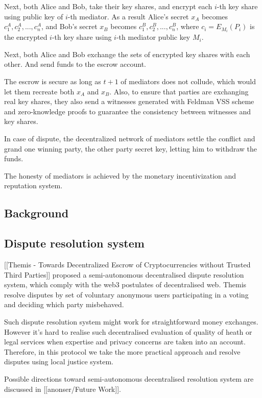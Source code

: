 \documentclass{article}
\begin{document}
Next, both Alice and Bob, take their key shares, and encrypt each $i$-th key share using public key of $i$-th mediator. As a result Alice's secret $x_A$ becomes ${c^A_1, c^A_2,...,c^A_n}$, and Bob's secret $x_B$ becomes ${c^B_1, c^B_2,...,c^B_n}$, where $c_i = E_{M_i}(P_i)$ is the encrypted $i$-th key share using $i$-th mediator public key $M_i$. 

Next, both Alice and Bob exchange the sets of encrypted key shares with each other. And send funds to the escrow account. 

The escrow is secure as long as $t+1$ of mediators does not collude, which would let them recreate both $x_A$ and $x_B$. Also, to ensure that parties are exchanging real key shares, they also send a witnesses generated with Feldman VSS scheme and zero-knowledge proofs to guarantee the consistency between witnesses and key shares.

In case of dispute, the decentralized network of mediators settle the conflict and grand one winning party, the other party secret key, letting him to withdraw the funds.

The honesty of mediators is achieved by the monetary incentivization and reputation system.

\subsection{Background}
\subsection{Dispute resolution system}

[[Themis - Towards Decentralized Escrow of Cryptocurrencies without Trusted Third Parties]] proposed a semi-autonomous decentralised dispute resolution system, which comply with the web3 postulates of decentralised web. Themis resolve disputes by set of voluntary anonymous users participating in a voting and deciding which party misbehaved. 

Such dispute resolution system might work for straightforward money exchanges. However it's hard to realise such decentralised evaluation of quality of heath or legal services when expertise and privacy concerns are taken into an account. Therefore, in this protocol we take the more practical approach and resolve disputes using local justice system. 

Possible directions toward semi-autonomous decentralised resolution system are discussed in [[anonser/Future Work]].
\end{document}
